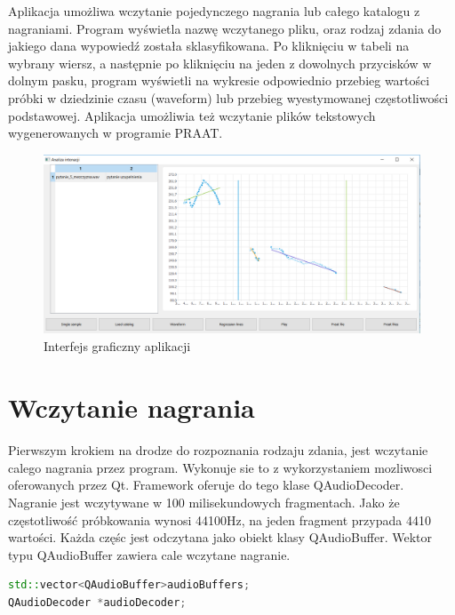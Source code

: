 \documentclass[a4paper,12 pt]{report}
\begin{document}
Aplikacja umożliwa wczytanie pojedynczego nagrania lub całego katalogu z nagraniami. Program wyświetla nazwę wczytanego pliku, oraz rodzaj zdania do jakiego dana wypowiedź została sklasyfikowana. Po kliknięciu w tabeli na wybrany wiersz, a następnie po kliknięciu na jeden z dowolnych przycisków w dolnym pasku, program wyświetli na wykresie odpowiednio przebieg wartości próbki w dziedzinie czasu (waveform) lub przebieg wyestymowanej częstotliwości podstawowej. Aplikacja umożliwia też wczytanie plików tekstowych wygenerowanych w programie PRAAT.
\begin{figure}[h]

\includegraphics[scale=0.5]{gui.png}
\caption{Interfejs graficzny aplikacji}
\end{figure}
\FloatBarrier
\section{Wczytanie nagrania}
Pierwszym krokiem na drodze do rozpoznania rodzaju zdania, jest wczytanie calego nagrania przez program. Wykonuje sie to z wykorzystaniem mozliwosci oferowanych przez Qt. Framework oferuje do tego klase QAudioDecoder. 
Nagranie jest wczytywane w 100 milisekundowych fragmentach. Jako że częstotliwość próbkowania wynosi 44100Hz, na jeden fragment przypada 4410 wartości. Każda częśc jest odczytana jako obiekt klasy QAudioBuffer. Wektor typu QAudioBuffer zawiera cale wczytane nagranie.
\begin{lstlisting}[caption={Połączenie sygnałów niosących informacje o starcie lub zakończeniu wczytywania nagrania, ze slotami},label={lst:label},language=C++]
std::vector<QAudioBuffer>audioBuffers;
QAudioDecoder *audioDecoder;
\end{lstlisting}
\end{document}

